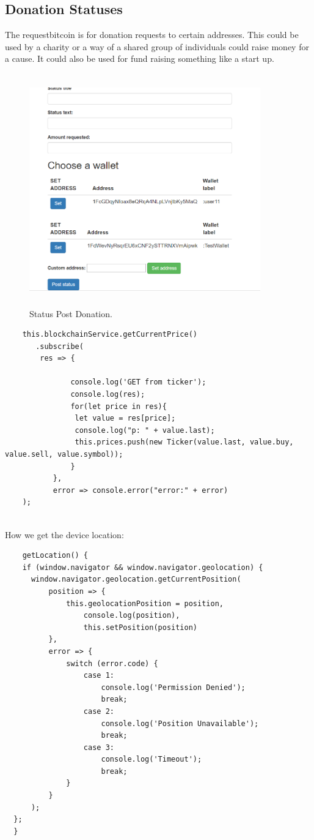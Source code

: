 \subsection{Donation Statuses}
The requestbitcoin is for donation requests to certain addresses. This could be used by a charity or a way of a shared group of individuals could raise money for a cause. It could also be used for fund raising something like a start up.

\begin{figure}[H]
\centering
\includegraphics[width=10cm, height=10cm]{img/post5.png}
\caption{Status Post Donation.}
\end{figure}

\begin{lstlisting}
    this.blockchainService.getCurrentPrice()
       .subscribe(
        res => {

               console.log('GET from ticker');
               console.log(res);
               for(let price in res){
                let value = res[price];
                console.log("p: " + value.last); 
                this.prices.push(new Ticker(value.last, value.buy, value.sell, value.symbol));
               } 
           },
           error => console.error("error:" + error)
    );
  
\end{lstlisting}

How we get the device location:
\begin{lstlisting}
    getLocation() {
    if (window.navigator && window.navigator.geolocation) {
      window.navigator.geolocation.getCurrentPosition(
          position => {
              this.geolocationPosition = position,
                  console.log(position),
                  this.setPosition(position)
          },
          error => {
              switch (error.code) {
                  case 1:
                      console.log('Permission Denied');
                      break;
                  case 2:
                      console.log('Position Unavailable');
                      break;
                  case 3:
                      console.log('Timeout');
                      break;
              }
          }
      );
  };
  }
  
\end{lstlisting}

